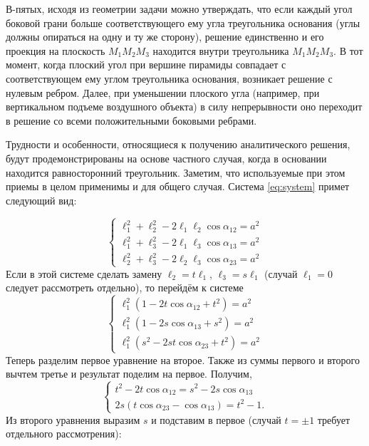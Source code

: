 \documentclass[../main.tex]{subfiles}
\begin{document}
В-пятых, исходя из геометрии задачи  можно утверждать, что если каждый угол боковой грани больше соответствующего ему угла треугольника основания (углы должны опираться на одну и ту же сторону), решение единственно и его проекция на плоскость $M_1 M_2 M_3$ находится внутри треугольника $M_1 M_2 M_3$. В тот момент, когда плоский угол при вершине пирамиды совпадает с соответствующем ему углом треугольника основания, возникает решение с нулевым ребром.  Далее, при уменьшении плоского угла (например, при вертикальном подъеме воздушного объекта) в силу непрерывности оно переходит в решение со всеми положительными боковыми ребрами.

Трудности и особенности, относящиеся к получению аналитического решения,  будут продемонстрированы на основе частного случая, когда в основании находится равносторонний треугольник. Заметим, что используемые при этом приемы в целом применимы и для общего случая. Система \eqref{eq:system} примет следующий вид:

\begin{equation}
  \begin{cases}
    \ell_1^2+\ell_2^2-2 \ell_1 \ell_2 \cos \alpha_{12} = a^2 \\
    \ell_1^2+\ell_3^2-2 \ell_1 \ell_3 \cos \alpha_{13} = a^2 \\
    \ell_2^2+\ell_3^2-2 \ell_2 \ell_3 \cos \alpha_{23} = a^2
  \end{cases}
  \label{ell_1}
\end{equation}
Если в этой системе сделать замену $\ell_2= t \ell_1$, $\ell_3= s \ell_1$ (случай $\ell_1=0$ следует рассмотреть отдельно), то перейдём к системе
\begin {equation}
  \begin{cases}
    \ell_1^2(1-2 t \cos \alpha_{12} + t^2) = a^2 \\
    \ell_1^2(1-2 s \cos \alpha_{13} + s^2) = a^2 \\
    \ell_1^2(s^2-2 s t \cos \alpha_{23} + t^2) = a^2
  \end{cases}
  \label {ell_2}
\end{equation}
Теперь разделим первое уравнение на второе. Также из суммы первого и второго вычтем третье и результат поделим на первое. Получим,
\begin{equation}
\left\{
\begin {matrix}
t^2-2 t \cos \alpha_{12}  =  s^2-2 s \cos \alpha_{13}  \\
2 s (t \cos \alpha_{23} - \cos \alpha_{13} ) = t^2-1.
\end {matrix}\right.
\label{ell_3}
\end{equation}
Из второго уравнения выразим $s$ и подставим в первое (случай $t=\pm 1$ требует отдельного рассмотрения):
\end{document}
